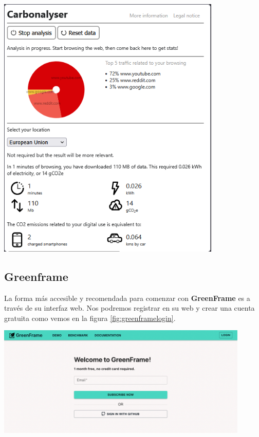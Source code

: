 \documentclass[12pt,a4paper]{report}
\begin{document}
\begin{center}
  \includegraphics[width=0.8\textwidth]{imagenes/Carbonalyser_3.png}
  \label{fig:resultCarbonalyser}
\end{center}

\subsection{Greenframe}
La forma más accesible y recomendada para comenzar con \textbf{GreenFrame} es a
través de su interfaz web. Nos podremos registrar en su web y crear una cuenta gratuita como vemos en la figura \ref{fig:greenframelogin}.

\begin{center}
  \includegraphics[width=0.9\textwidth]{imagenes/Greenframe_1.png}
  \label{fig:greenframelogin}
\end{center}
\end{document}
